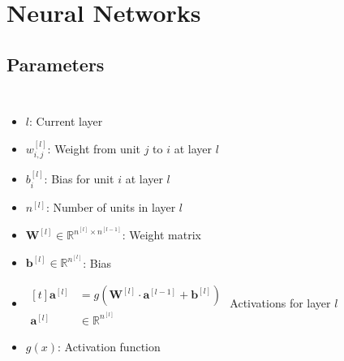 \section{Neural Networks}
\begin{frame}{\insertsec}
	
\end{frame}

\subsection{Parameters}
\begin{frame}{\insertsubsec}
    \begin{columns}[t]
        \begin{itemize}
            \item $l$: Current layer
            \item $w_{i, j}^{[l]}$: Weight from unit $j$ to $i$ at layer $l$
            \item $b_{i}^{[l]}$: Bias for unit $i$ at layer $l$
            \item $n^{[l]}$: Number of units in layer $l$
            \item $\bm{W}^{[l]} \in \mathbb{R}^{n^{[l]} \times n^{[l - 1]}}$: Weight matrix
            \item $\bm{b}^{[l]} \in \mathbb{R}^{n^{[l]}}$: Bias
            \item $
            \begin{aligned}[t]
            \bm{a}^{[l]} &= g(\bm{W}^{[l]}\cdot \bm{a}^{[l - 1]} + \bm{b}^{[l]}) \\
            \bm{a}^{[l]} &\in \mathbb{R}^{n^{[l]}}
            \end{aligned}
            $ Activations for layer $l$
            \item $g(x)$: Activation function
        \end{itemize}
        \centering
        
    \end{columns}
\end{frame}
